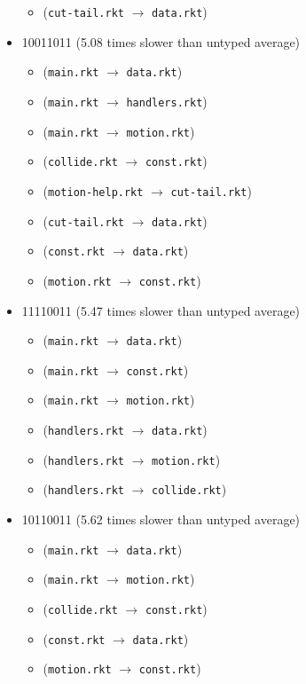 \documentclass{article}
\newcommand{\mono}[1]{\texttt{#1}}
\begin{document}
\begin{itemize}
\begin{itemize}
  \item (\mono{cut-tail.rkt} $\rightarrow$ \mono{data.rkt})
  \end{itemize}
\item 10011011 (5.08 times slower than untyped average)
  \begin{itemize}
  \item (\mono{main.rkt} $\rightarrow$ \mono{data.rkt})
  \item (\mono{main.rkt} $\rightarrow$ \mono{handlers.rkt})
  \item (\mono{main.rkt} $\rightarrow$ \mono{motion.rkt})
  \item (\mono{collide.rkt} $\rightarrow$ \mono{const.rkt})
  \item (\mono{motion-help.rkt} $\rightarrow$ \mono{cut-tail.rkt})
  \item (\mono{cut-tail.rkt} $\rightarrow$ \mono{data.rkt})
  \item (\mono{const.rkt} $\rightarrow$ \mono{data.rkt})
  \item (\mono{motion.rkt} $\rightarrow$ \mono{const.rkt})
  \end{itemize}
\item 11110011 (5.47 times slower than untyped average)
  \begin{itemize}
  \item (\mono{main.rkt} $\rightarrow$ \mono{data.rkt})
  \item (\mono{main.rkt} $\rightarrow$ \mono{const.rkt})
  \item (\mono{main.rkt} $\rightarrow$ \mono{motion.rkt})
  \item (\mono{handlers.rkt} $\rightarrow$ \mono{data.rkt})
  \item (\mono{handlers.rkt} $\rightarrow$ \mono{motion.rkt})
  \item (\mono{handlers.rkt} $\rightarrow$ \mono{collide.rkt})
  \end{itemize}
\item 10110011 (5.62 times slower than untyped average)
  \begin{itemize}
  \item (\mono{main.rkt} $\rightarrow$ \mono{data.rkt})
  \item (\mono{main.rkt} $\rightarrow$ \mono{motion.rkt})
  \item (\mono{collide.rkt} $\rightarrow$ \mono{const.rkt})
  \item (\mono{const.rkt} $\rightarrow$ \mono{data.rkt})
  \item (\mono{motion.rkt} $\rightarrow$ \mono{const.rkt})

\end{itemize}
\end{itemize}
\end{document}
